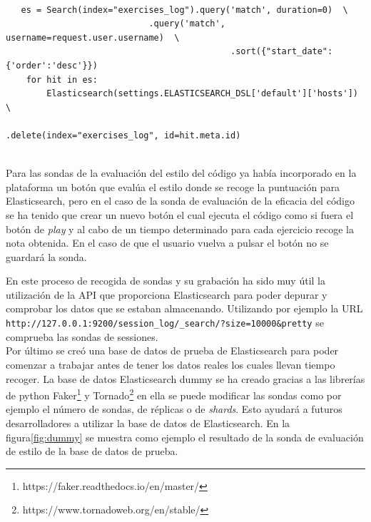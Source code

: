 \\
{\footnotesize
\begin{verbatim}
   es = Search(index="exercises_log").query('match', duration=0)  \
   				            .query('match', username=request.user.username)  \
        					                .sort({"start_date": {'order':'desc'}})
    for hit in es:
        Elasticsearch(settings.ELASTICSEARCH_DSL['default']['hosts'])  \ 
    				                        .delete(index="exercises_log", id=hit.meta.id)
\end{verbatim}
}
\\
Para las sondas de la evaluación del estilo del código ya había incorporado en la plataforma un botón que evalúa el estilo donde se recoge la puntuación para Elasticsearch, pero en el caso de la sonda de evaluación de la eficacia del código se ha tenido que crear un nuevo botón el cual ejecuta el código como si fuera el botón de \textit{play} y al cabo de un tiempo determinado para cada ejercicio recoge la nota obtenida. En el caso de que el usuario vuelva a pulsar el botón no se guardará la sonda.


En este proceso de recogida de sondas y su grabación ha sido muy útil la utilización de la API que proporciona Elasticsearch para poder depurar y comprobar los datos que se estaban almacenando. Utilizando por ejemplo la URL \texttt{http://127.0.0.1:9200/session\_log/\_search/?size=10000&pretty} se comprueba las sondas de sessiones.\\

Por último se creó una base de datos de prueba de Elasticsearch para poder comenzar a trabajar antes de tener los datos reales los cuales llevan tiempo recoger. La base de datos Elasticsearch dummy se ha creado gracias a las librerías de python Faker\footnote{https://faker.readthedocs.io/en/master/} y Tornado\footnote{https://www.tornadoweb.org/en/stable/} en ella se puede modificar las sondas como por ejemplo el número de sondas, de réplicas o de \textit{shards}. Esto ayudará a futuros desarrolladores a utilizar la base de datos de Elasticsearch. En la figura\ref{fig:dummy} se muestra como ejemplo el resultado de la sonda de evaluación de estilo de la base de datos de prueba.


